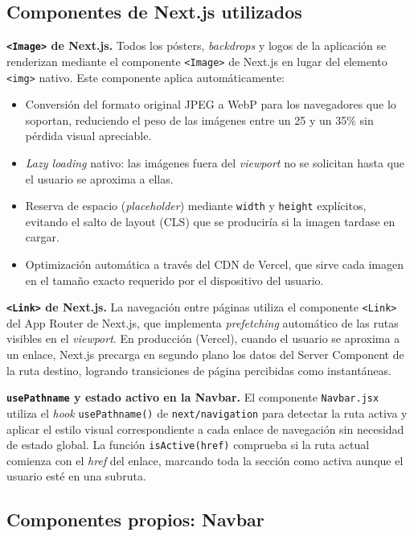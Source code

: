 \subsection{Componentes de Next.js utilizados}

\textbf{\texttt{<Image>} de Next.js.} Todos los pósters, \textit{backdrops} y logos de la aplicación se renderizan mediante el componente \texttt{<Image>} de Next.js en lugar del elemento \texttt{<img>} nativo. Este componente aplica automáticamente:

\begin{itemize}
\item Conversión del formato original JPEG a WebP para los navegadores que lo soportan, reduciendo el peso de las imágenes entre un 25 y un 35\% sin pérdida visual apreciable.
\item \textit{Lazy loading} nativo: las imágenes fuera del \textit{viewport} no se solicitan hasta que el usuario se aproxima a ellas.
\item Reserva de espacio (\textit{placeholder}) mediante \texttt{width} y \texttt{height} explícitos, evitando el salto de layout (CLS) que se produciría si la imagen tardase en cargar.
\item Optimización automática a través del CDN de Vercel, que sirve cada imagen en el tamaño exacto requerido por el dispositivo del usuario.
\end{itemize}

\textbf{\texttt{<Link>} de Next.js.} La navegación entre páginas utiliza el componente \texttt{<Link>} del App Router de Next.js, que implementa \textit{prefetching} automático de las rutas visibles en el \textit{viewport}. En producción (Vercel), cuando el usuario se aproxima a un enlace, Next.js precarga en segundo plano los datos del Server Component de la ruta destino, logrando transiciones de página percibidas como instantáneas.

\textbf{\texttt{usePathname} y estado activo en la Navbar.} El componente \texttt{Navbar.jsx} utiliza el \textit{hook} \texttt{usePathname()} de \texttt{next/navigation} para detectar la ruta activa y aplicar el estilo visual correspondiente a cada enlace de navegación sin necesidad de estado global. La función \texttt{isActive(href)} comprueba si la ruta actual comienza con el \textit{href} del enlace, marcando toda la sección como activa aunque el usuario esté en una subruta.

\subsection{Componentes propios: Navbar}


